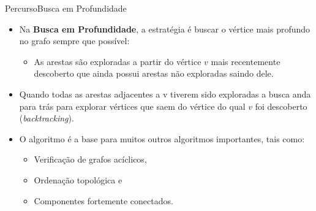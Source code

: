 \documentclass{beamer}
\begin{document}
\begin{frame}{Percurso}{Busca em Profundidade}
\begin{itemize}
\item Na {\bf Busca em Profundidade}, a estratégia é buscar o vértice mais profundo no grafo sempre que possível:
\begin{itemize}
\item As arestas são exploradas a partir do vértice $v$ mais recentemente descoberto que ainda possui arestas não exploradas saindo dele.
\end{itemize}
\item Quando todas as arestas adjacentes a v tiverem sido exploradas a busca anda para trás para explorar vértices que
saem do vértice do qual $v$ foi descoberto ({\it backtracking}).
\item O algoritmo é a base para muitos outros algoritmos importantes, tais como:
\begin{itemize}
\item Verificação de grafos acíclicos, 
\item Ordenação topológica e 
\item Componentes fortemente conectados.
\end{itemize} 
\end{itemize}
\end{frame}

\end{document}
